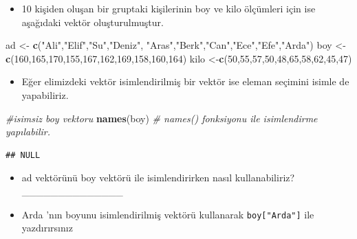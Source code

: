 \documentclass[
  oneside]{book}
\newenvironment{Shaded}{\begin{snugshade}}{\end{snugshade}}
\newcommand{\CommentTok}[1]{\textcolor[rgb]{0.56,0.35,0.01}{\textit{#1}}}
\newcommand{\DecValTok}[1]{\textcolor[rgb]{0.00,0.00,0.81}{#1}}
\newcommand{\FunctionTok}[1]{\textcolor[rgb]{0.13,0.29,0.53}{\textbf{#1}}}
\newcommand{\NormalTok}[1]{#1}
\newcommand{\OtherTok}[1]{\textcolor[rgb]{0.56,0.35,0.01}{#1}}
\newcommand{\StringTok}[1]{\textcolor[rgb]{0.31,0.60,0.02}{#1}}
\providecommand{\tightlist}{%
  \setlength{\itemsep}{0pt}\setlength{\parskip}{0pt}}
\begin{document}
\begin{itemize}
\tightlist
\item
  10 kişiden oluşan bir gruptaki kişilerinin boy ve kilo ölçümleri için ise aşağıdaki vektör oluşturulmuştur.
\end{itemize}

\begin{Shaded}
\begin{Highlighting}[]
\NormalTok{ad  }\OtherTok{\textless{}{-}}  \FunctionTok{c}\NormalTok{(}\StringTok{"Ali"}\NormalTok{,}\StringTok{"Elif"}\NormalTok{,}\StringTok{"Su"}\NormalTok{,}\StringTok{"Deniz"}\NormalTok{,}
\StringTok{"Aras"}\NormalTok{,}\StringTok{"Berk"}\NormalTok{,}\StringTok{"Can"}\NormalTok{,}\StringTok{"Ece"}\NormalTok{,}\StringTok{"Efe"}\NormalTok{,}\StringTok{"Arda"}\NormalTok{)}
\NormalTok{boy }\OtherTok{\textless{}{-}} \FunctionTok{c}\NormalTok{(}\DecValTok{160}\NormalTok{,}\DecValTok{165}\NormalTok{,}\DecValTok{170}\NormalTok{,}\DecValTok{155}\NormalTok{,}\DecValTok{167}\NormalTok{,}\DecValTok{162}\NormalTok{,}\DecValTok{169}\NormalTok{,}\DecValTok{158}\NormalTok{,}\DecValTok{160}\NormalTok{,}\DecValTok{164}\NormalTok{)}
\NormalTok{kilo }\OtherTok{\textless{}{-}}\FunctionTok{c}\NormalTok{(}\DecValTok{50}\NormalTok{,}\DecValTok{55}\NormalTok{,}\DecValTok{57}\NormalTok{,}\DecValTok{50}\NormalTok{,}\DecValTok{48}\NormalTok{,}\DecValTok{65}\NormalTok{,}\DecValTok{58}\NormalTok{,}\DecValTok{62}\NormalTok{,}\DecValTok{45}\NormalTok{,}\DecValTok{47}\NormalTok{)}
\end{Highlighting}
\end{Shaded}

\begin{itemize}
\tightlist
\item
  Eğer elimizdeki vektör isimlendirilmiş bir vektör ise eleman seçimini isimle de yapabiliriz.
\end{itemize}

\begin{Shaded}
\begin{Highlighting}[]
\CommentTok{\#isimsiz boy vektoru}
\FunctionTok{names}\NormalTok{(boy) }\CommentTok{\# names() fonksiyonu ile isimlendirme yapılabilir.}
\end{Highlighting}
\end{Shaded}

\begin{verbatim}
## NULL
\end{verbatim}

\begin{itemize}
\item
  ad vektörünü boy vektörü ile isimlendirirken nasıl kullanabiliriz? \_\_\_\_\_\_\_\_\_\_\_\_\_\_
\item
  Arda 'nın boyunu isimlendirilmiş vektörü kullanarak \texttt{boy{[}"Arda"{]}} ile yazdırırsınız
\end{itemize}
\end{document}
